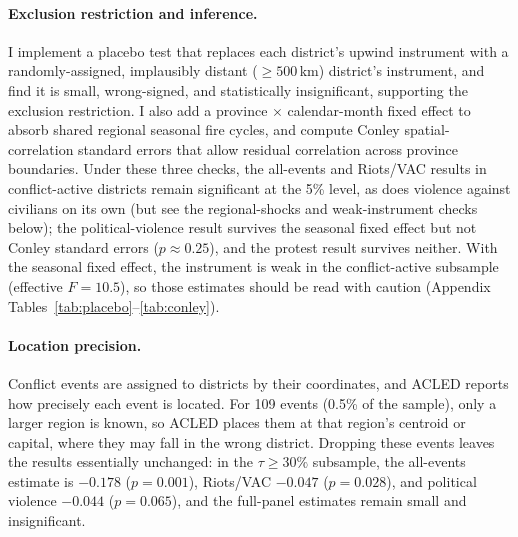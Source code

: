 \documentclass[12pt]{article}
\begin{document}
\paragraph{Exclusion restriction and inference.} I implement a placebo test that replaces each district's upwind instrument with a randomly-assigned, implausibly distant ($\geq 500$\,km) district's instrument, and find it is small, wrong-signed, and statistically insignificant, supporting the exclusion restriction. I also add a province $\times$ calendar-month fixed effect to absorb shared regional seasonal fire cycles, and compute Conley spatial-correlation standard errors that allow residual correlation across province boundaries. Under these three checks, the all-events and Riots/VAC results in conflict-active districts remain significant at the 5\% level, as does violence against civilians on its own (but see the regional-shocks and weak-instrument checks below); the political-violence result survives the seasonal fixed effect but not Conley standard errors ($p \approx 0.25$), and the protest result survives neither. With the seasonal fixed effect, the instrument is weak in the conflict-active subsample (effective $F = 10.5$), so those estimates should be read with caution (Appendix Tables~\ref{tab:placebo}--\ref{tab:conley}).

\paragraph{Location precision.} Conflict events are assigned to districts by their coordinates, and ACLED reports how precisely each event is located. For 109 events (0.5\% of the sample), only a larger region is known, so ACLED places them at that region's centroid or capital, where they may fall in the wrong district. Dropping these events leaves the results essentially unchanged: in the $\tau \geq 30\%$ subsample, the all-events estimate is $-0.178$ ($p=0.001$), Riots/VAC $-0.047$ ($p=0.028$), and political violence $-0.044$ ($p=0.065$), and the full-panel estimates remain small and insignificant.
\end{document}
